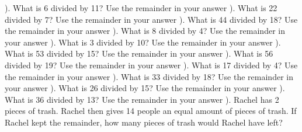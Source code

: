 \documentclass{article}%
\begin{document}
). What is 6 divided by 11? Use the remainder in your answer%
\newline%
\newline%
). What is 22 divided by 7? Use the remainder in your answer%
\newline%
\newline%
). What is 44 divided by 18? Use the remainder in your answer%
\newline%
\newline%
). What is 8 divided by 4? Use the remainder in your answer%
\newline%
\newline%
). What is 3 divided by 10? Use the remainder in your answer%
\newline%
\newline%
). What is 53 divided by 15? Use the remainder in your answer%
\newline%
\newline%
). What is 56 divided by 19? Use the remainder in your answer%
\newline%
\newline%
). What is 17 divided by 4? Use the remainder in your answer%
\newline%
\newline%
). What is 33 divided by 18? Use the remainder in your answer%
\newline%
\newline%
). What is 26 divided by 15? Use the remainder in your answer%
\newline%
\newline%
). What is 36 divided by 13? Use the remainder in your answer%
\newline%
\newline%
). Rachel has 2 pieces of trash. Rachel then gives 14 people an equal amount of pieces of trash. If Rachel kept the remainder, how many pieces of trash would Rachel have left?%
\newline%
\end{document}
